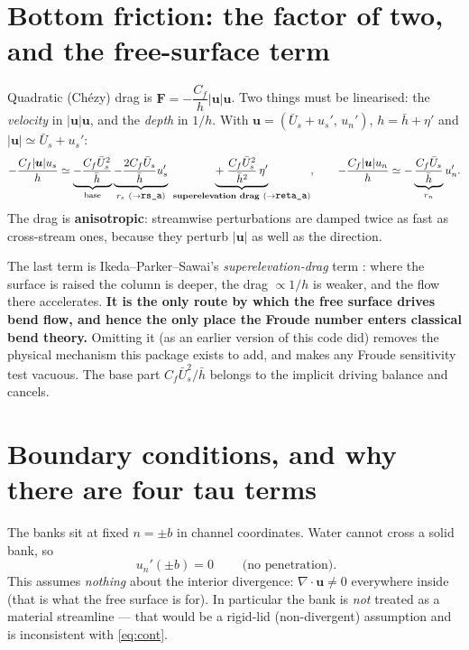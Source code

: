 \documentclass[11pt]{article}
\newcommand{\us}{u_s}
\newcommand{\un}{u_n}
\newcommand{\Us}{\bar U_s}
\newcommand{\code}[1]{\texttt{\small #1}}
\begin{document}
\section{Bottom friction: the factor of two, and the free-surface term}

Quadratic (Ch\'ezy) drag is $\bm F=-\dfrac{C_f}{h}|\bm u|\bm u$. Two things must be
linearised: the \emph{velocity} in $|\bm u|\bm u$, and the \emph{depth} in $1/h$.
With $\bm u=(\Us+\us',\,\un')$, $h=\bar h+\eta'$ and $|\bm u|\simeq\Us+\us'$:
\begin{equation}
  -\frac{C_f|\bm u|\us}{h}
  \simeq\underbrace{-\frac{C_f\Us^{2}}{\bar h}}_{\text{base}}
  \underbrace{-\frac{2C_f\Us}{\bar h}\us'}_{r_s\ (\to\code{rs\_a})}
  \;\underbrace{+\;\frac{C_f\Us^{2}}{\bar h^{2}}\,\eta'}_{\text{\bf superelevation drag}\ (\to\code{reta\_a})},
  \qquad
  -\frac{C_f|\bm u|\un}{h}\simeq-\underbrace{\frac{C_f\Us}{\bar h}}_{r_n}\un' .
\end{equation}
The drag is \textbf{anisotropic}: streamwise perturbations are damped twice as fast
as cross-stream ones, because they perturb $|\bm u|$ as well as the direction.

The last term is Ikeda--Parker--Sawai's \emph{superelevation-drag} term
\cite{ikeda1981}: where the surface is raised the column is deeper, the drag
$\propto1/h$ is weaker, and the flow there accelerates. \textbf{It is the only route
by which the free surface drives bend flow, and hence the only place the Froude
number enters classical bend theory.} Omitting it (as an earlier version of this
code did) removes the physical mechanism this package exists to add, and makes any
Froude sensitivity test vacuous. The base part $C_f\Us^2/\bar h$ belongs to the
implicit driving balance and cancels.

\section{Boundary conditions, and why there are four tau terms}

The banks sit at fixed $n=\pm b$ in channel coordinates. Water cannot cross a
solid bank, so
\begin{equation}
  \boxed{\;\un'(\pm b)=0\;}\qquad\text{(no penetration)} .
\end{equation}
This assumes \emph{nothing} about the interior divergence: $\nabla\cdot\bm u\neq0$
everywhere inside (that is what the free surface is for). In particular the bank is
\emph{not} treated as a material streamline --- that would be a rigid-lid
(non-divergent) assumption and is inconsistent with \eqref{eq:cont}.
\end{document}

